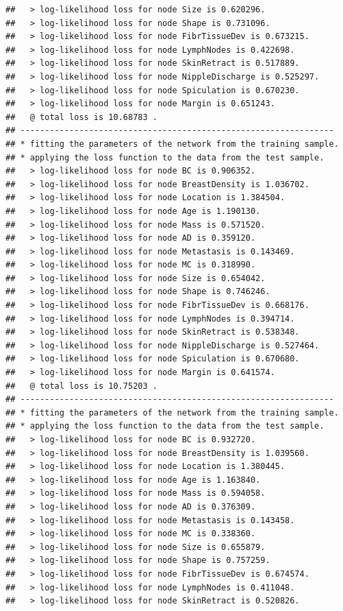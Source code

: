 \documentclass[]{article}
\begin{document}
\begin{verbatim}
##   > log-likelihood loss for node Size is 0.620296.
##   > log-likelihood loss for node Shape is 0.731096.
##   > log-likelihood loss for node FibrTissueDev is 0.673215.
##   > log-likelihood loss for node LymphNodes is 0.422698.
##   > log-likelihood loss for node SkinRetract is 0.517889.
##   > log-likelihood loss for node NippleDischarge is 0.525297.
##   > log-likelihood loss for node Spiculation is 0.670230.
##   > log-likelihood loss for node Margin is 0.651243.
##   @ total loss is 10.68783 .
## ----------------------------------------------------------------
## * fitting the parameters of the network from the training sample.
## * applying the loss function to the data from the test sample.
##   > log-likelihood loss for node BC is 0.906352.
##   > log-likelihood loss for node BreastDensity is 1.036702.
##   > log-likelihood loss for node Location is 1.384504.
##   > log-likelihood loss for node Age is 1.190130.
##   > log-likelihood loss for node Mass is 0.571520.
##   > log-likelihood loss for node AD is 0.359120.
##   > log-likelihood loss for node Metastasis is 0.143469.
##   > log-likelihood loss for node MC is 0.318990.
##   > log-likelihood loss for node Size is 0.654042.
##   > log-likelihood loss for node Shape is 0.746246.
##   > log-likelihood loss for node FibrTissueDev is 0.668176.
##   > log-likelihood loss for node LymphNodes is 0.394714.
##   > log-likelihood loss for node SkinRetract is 0.538348.
##   > log-likelihood loss for node NippleDischarge is 0.527464.
##   > log-likelihood loss for node Spiculation is 0.670680.
##   > log-likelihood loss for node Margin is 0.641574.
##   @ total loss is 10.75203 .
## ----------------------------------------------------------------
## * fitting the parameters of the network from the training sample.
## * applying the loss function to the data from the test sample.
##   > log-likelihood loss for node BC is 0.932720.
##   > log-likelihood loss for node BreastDensity is 1.039560.
##   > log-likelihood loss for node Location is 1.380445.
##   > log-likelihood loss for node Age is 1.163840.
##   > log-likelihood loss for node Mass is 0.594058.
##   > log-likelihood loss for node AD is 0.376309.
##   > log-likelihood loss for node Metastasis is 0.143458.
##   > log-likelihood loss for node MC is 0.338360.
##   > log-likelihood loss for node Size is 0.655879.
##   > log-likelihood loss for node Shape is 0.757259.
##   > log-likelihood loss for node FibrTissueDev is 0.674574.
##   > log-likelihood loss for node LymphNodes is 0.411048.
##   > log-likelihood loss for node SkinRetract is 0.520826.

\end{verbatim}
\end{document}
